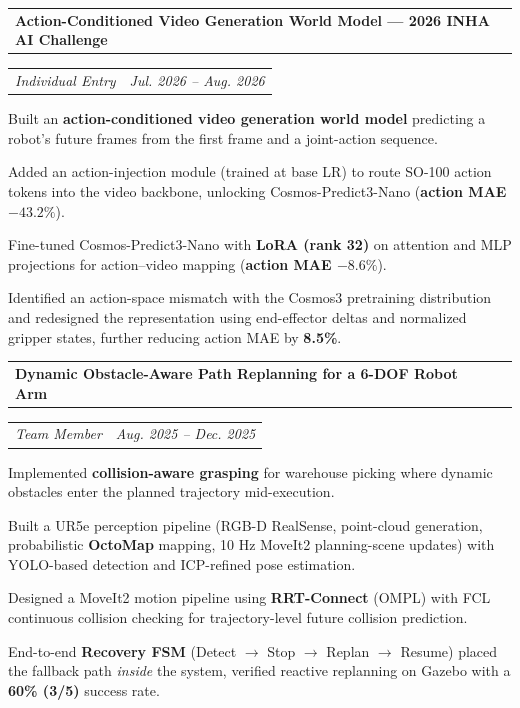 \documentclass[10pt,a4paper]{article}
\makeatletter
\newcommand{\cvEntry}[4]{%
  \par\vspace{3pt}%
  \noindent\begin{tabularx}{\textwidth}{@{}X r@{}}
    \textbf{#1} & {\color{accent}#2} \\
  \end{tabularx}\par\vspace{-4pt}%
  \noindent\begin{tabularx}{\textwidth}{@{}X r@{}}
    \textit{#3} & {\color{accent}\textit{#4}} \\
  \end{tabularx}\par}
\newenvironment{cvitems}{%
  \vspace{-2pt}%
  \begin{list}{\textbullet}{%
    \setlength{\leftmargin}{1.4em}%
    \setlength{\rightmargin}{0em}%
    \setlength{\topsep}{1pt}%
    \setlength{\itemsep}{2pt}%
    \setlength{\parsep}{0pt}%
    \setlength{\labelsep}{0.6em}}%
}{\end{list}\vspace{2pt}}
\makeatother
\begin{document}
\cvEntry{Action-Conditioned Video Generation World Model --- 2026 INHA AI Challenge}{}{Individual Entry}{Jul. 2026 -- Aug. 2026}
\begin{cvitems}
  \item Built an \textbf{action-conditioned video generation world model} predicting a robot's future frames from the first frame and a joint-action sequence.
  \item Added an action-injection module (trained at base LR) to route SO-100 action tokens into the video backbone, unlocking Cosmos-Predict3-Nano (\textbf{action MAE $-43.2\%$}).
  \item Fine-tuned Cosmos-Predict3-Nano with \textbf{LoRA (rank 32)} on attention and MLP projections for action--video mapping (\textbf{action MAE $-8.6\%$}).
  \item Identified an action-space mismatch with the Cosmos3 pretraining distribution and redesigned the representation using end-effector deltas and normalized gripper states, further reducing action MAE by \textbf{8.5\%}.
\end{cvitems}

\cvEntry{Dynamic Obstacle-Aware Path Replanning for a 6-DOF Robot Arm}{}{Team Member \quad {\small (3-person team)}}{Aug. 2025 -- Dec. 2025}
\begin{cvitems}
  \item Implemented \textbf{collision-aware grasping} for warehouse picking where dynamic obstacles enter the planned trajectory mid-execution.
  \item Built a UR5e perception pipeline (RGB-D RealSense, point-cloud generation, probabilistic \textbf{OctoMap} mapping, 10 Hz MoveIt2 planning-scene updates) with YOLO-based detection and ICP-refined pose estimation.
  \item Designed a MoveIt2 motion pipeline using \textbf{RRT-Connect} (OMPL) with FCL continuous collision checking for trajectory-level future collision prediction.
  \item End-to-end \textbf{Recovery FSM} (Detect $\to$ Stop $\to$ Replan $\to$ Resume) placed the fallback path \textit{inside} the system, verified reactive replanning on Gazebo with a \textbf{60\% (3/5)} success rate.
\end{cvitems}
\end{document}
